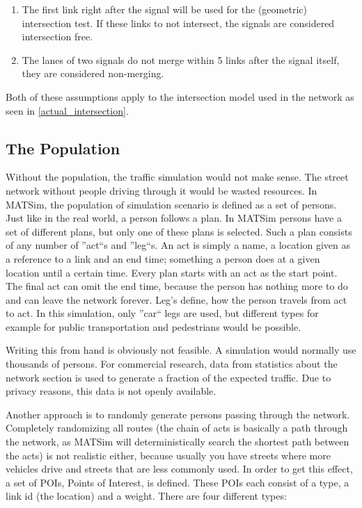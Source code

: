 \begin{enumerate}
	\item The first link right after the signal will be used for the (geometric) intersection test. If these links to not intersect, the signals are considered intersection free.
	\item The lanes of two signals do not merge within 5 links after the signal itself, they are considered non-merging.
\end{enumerate}

Both of these assumptions apply to the intersection model used in the network as seen in \autoref{actual_intersection}.

\subsection*{The Population}

Without the population, the traffic simulation would not make sense. The street network without people driving through it would be wasted resources. In MATSim, the population of simulation scenario is defined as a set of persons. Just like in the real world, a person follows a plan. In MATSim persons have a set of different plans, but only one of these plans is selected. Such a plan consists of any number of ''act``s and ''leg``s. An act is simply a name, a location given as a reference to a link and an end time; something a person does at a given location until a certain time. Every plan starts with an act as the start point. The final act can omit the end time, because the person has nothing more to do and can leave the network forever. Leg's define, how the person travels from act to act. In this simulation, only ''car`` legs are used, but different types for example for public transportation and pedestrians would be possible.

Writing this from hand is obviously not feasible. A simulation would normally use thousands of persons. For commercial research, data from statistics about the network section is used to generate a fraction of the expected traffic. Due to privacy reasons, this data is not openly available.

Another approach is to randomly generate persons passing through the network. Completely randomizing all routes (the chain of acts is basically a path through the network, as MATSim will deterministically search the shortest path between the acts) is not realistic either, because usually you have streets where more vehicles drive and streets that are less commonly used. In order to get this effect, a set of POIs, Points of Interest, is defined. These POIs each consist of a type, a link id (the location) and a weight. There are four different types:

